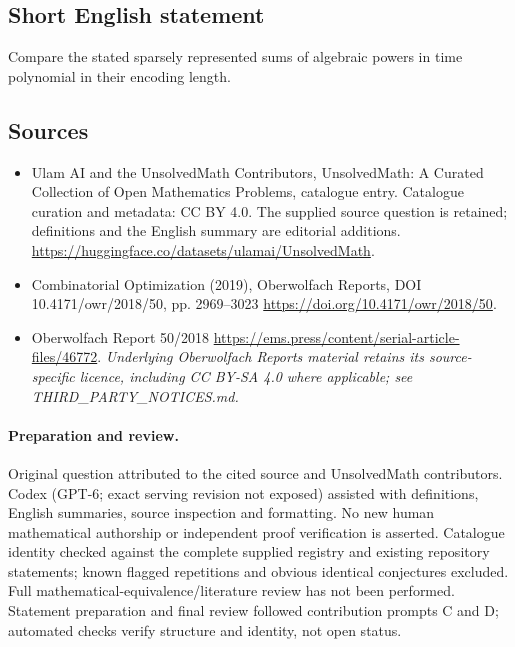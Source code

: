 \documentclass[11pt]{article}
\begin{document}
\subsection{Short English statement}
Compare the stated sparsely represented sums of algebraic powers in time polynomial in their encoding length.
\subsection{Sources}
\begin{itemize}
\item[\hypertarget{source:statement:1}{S1}] Ulam AI and the UnsolvedMath Contributors, UnsolvedMath: A Curated Collection of Open Mathematics Problems, catalogue entry. Catalogue curation and metadata: CC BY 4.0. The supplied source question is retained; definitions and the English summary are editorial additions.
\url{https://huggingface.co/datasets/ulamai/UnsolvedMath}.
\item[\hypertarget{source:statement:2}{S2}] Combinatorial Optimization (2019), Oberwolfach Reports, DOI 10.4171/owr/2018/50, pp. 2969--3023
\url{https://doi.org/10.4171/owr/2018/50}.
\item[\hypertarget{source:statement:3}{S3}] Oberwolfach Report 50/2018
\url{https://ems.press/content/serial-article-files/46772}.
\textit{Underlying Oberwolfach Reports material retains its source-specific licence, including CC BY-SA 4.0 where applicable; see THIRD\_PARTY\_NOTICES.md.}
\end{itemize}
\paragraph{Preparation and review.}
Original question attributed to the cited source and UnsolvedMath contributors. Codex (GPT-6; exact serving revision not exposed) assisted with definitions, English summaries, source inspection and formatting. No new human mathematical authorship or independent proof verification is asserted. Catalogue identity checked against the complete supplied registry and existing repository statements; known flagged repetitions and obvious identical conjectures excluded. Full mathematical-equivalence/literature review has not been performed. Statement preparation and final review followed contribution prompts C and D; automated checks verify structure and identity, not open status.
\label{end:statement}
\end{document}
